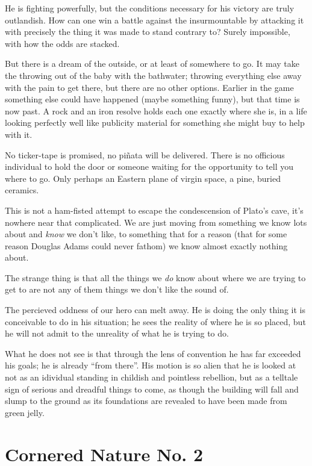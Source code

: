 \documentclass{book}
\begin{document}
He is fighting powerfully, but the conditions necessary for his victory are
truly outlandish. How can one win a battle against the insurmountable by
attacking it with precisely the thing it was made to stand contrary to? Surely
impossible, with how the odds are stacked.

But there is a dream of the outside, or at least of somewhere to go. It may
take the throwing out of the baby with the bathwater; throwing everything else
away with the pain to get there, but there are no other options. Earlier in the
game something else could have happened (maybe something funny), but that time
is now past. A rock and an iron resolve holds each one exactly where she is, in
a life looking perfectly well like publicity material for something she might
buy to help with it.

No ticker-tape is promised, no piñata will be delivered. There is no officious
individual to hold the door or someone waiting for the opportunity to tell you
where to go. Only perhaps an Eastern plane of virgin space, a pine, buried
ceramics.

This is not a ham-fisted attempt to escape the condescension of Plato's cave,
it's nowhere near that complicated.  We are just moving from something we know
lots about and \emph{know} we don't like, to something that for a reason (that
for some reason Douglas Adams could never fathom) we know almost exactly
nothing about.

The strange thing is that all the things we \emph{do} know about where we are
trying to get to are not any of them things we don't like the sound of.

The percieved oddness of our hero can melt away. He is doing the only thing it
is conceivable to do in his situation; he sees the reality of where he is so
placed, but he will not admit to the unreality of what he is trying to do.

What he does not see is that through the lens of convention he has far exceeded
his goals; he is already ``from there''. His motion is so alien that he is
looked at not as an idividual standing in childish and pointless rebellion, but
as a telltale sign of serious and dreadful things to come, as though the
building will fall and slump to the ground as its foundations are revealed to
have been made from green jelly.

\chapter{Cornered Nature No. 2}
\end{document}
